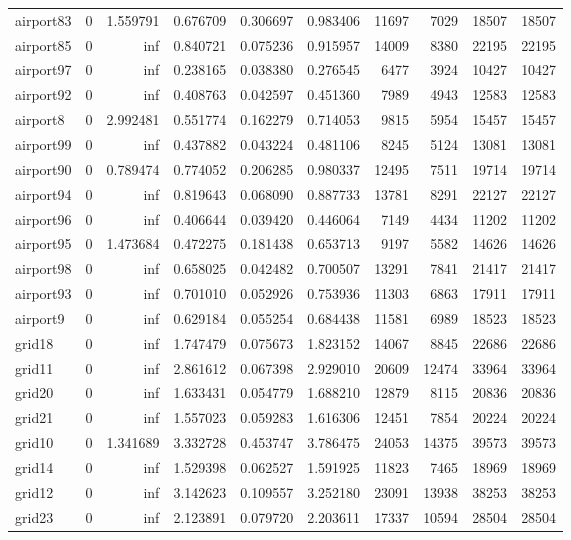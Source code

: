 \begin{longtable}{|l|r|r|r|r|r|r|r|r|r|}
airport83 & 0 & 1.559791 & 0.676709 & 0.306697 & 0.983406 & 11697 & 7029 & 18507 & 18507 \\
airport85 & 0 & inf & 0.840721 & 0.075236 & 0.915957 & 14009 & 8380 & 22195 & 22195 \\
airport97 & 0 & inf & 0.238165 & 0.038380 & 0.276545 & 6477 & 3924 & 10427 & 10427 \\
airport92 & 0 & inf & 0.408763 & 0.042597 & 0.451360 & 7989 & 4943 & 12583 & 12583 \\
airport8 & 0 & 2.992481 & 0.551774 & 0.162279 & 0.714053 & 9815 & 5954 & 15457 & 15457 \\
airport99 & 0 & inf & 0.437882 & 0.043224 & 0.481106 & 8245 & 5124 & 13081 & 13081 \\
airport90 & 0 & 0.789474 & 0.774052 & 0.206285 & 0.980337 & 12495 & 7511 & 19714 & 19714 \\
airport94 & 0 & inf & 0.819643 & 0.068090 & 0.887733 & 13781 & 8291 & 22127 & 22127 \\
airport96 & 0 & inf & 0.406644 & 0.039420 & 0.446064 & 7149 & 4434 & 11202 & 11202 \\
airport95 & 0 & 1.473684 & 0.472275 & 0.181438 & 0.653713 & 9197 & 5582 & 14626 & 14626 \\
airport98 & 0 & inf & 0.658025 & 0.042482 & 0.700507 & 13291 & 7841 & 21417 & 21417 \\
airport93 & 0 & inf & 0.701010 & 0.052926 & 0.753936 & 11303 & 6863 & 17911 & 17911 \\
airport9 & 0 & inf & 0.629184 & 0.055254 & 0.684438 & 11581 & 6989 & 18523 & 18523 \\
grid18 & 0 & inf & 1.747479 & 0.075673 & 1.823152 & 14067 & 8845 & 22686 & 22686 \\
grid11 & 0 & inf & 2.861612 & 0.067398 & 2.929010 & 20609 & 12474 & 33964 & 33964 \\
grid20 & 0 & inf & 1.633431 & 0.054779 & 1.688210 & 12879 & 8115 & 20836 & 20836 \\
grid21 & 0 & inf & 1.557023 & 0.059283 & 1.616306 & 12451 & 7854 & 20224 & 20224 \\
grid10 & 0 & 1.341689 & 3.332728 & 0.453747 & 3.786475 & 24053 & 14375 & 39573 & 39573 \\
grid14 & 0 & inf & 1.529398 & 0.062527 & 1.591925 & 11823 & 7465 & 18969 & 18969 \\
grid12 & 0 & inf & 3.142623 & 0.109557 & 3.252180 & 23091 & 13938 & 38253 & 38253 \\
grid23 & 0 & inf & 2.123891 & 0.079720 & 2.203611 & 17337 & 10594 & 28504 & 28504 \\

\end{longtable}
